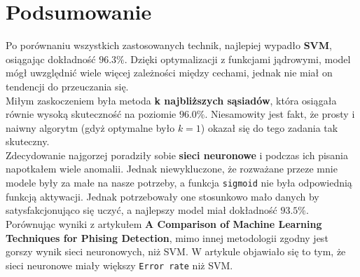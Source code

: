 \documentclass[polish,12pt,a4paper]{extarticle}
\begin{document}
\section*{Podsumowanie}
Po porównaniu wszystkich zastosowanych technik, najlepiej wypadło \textbf{SVM}, osiągając dokładność $96.3 \%$. Dzięki optymalizacji z funkcjami jądrowymi, model mógł uwzględnić wiele więcej zależności między cechami, jednak nie miał on tendencji do przeuczania się. \smallskip \\
Miłym zaskoczeniem była metoda \textbf{k najbliższych sąsiadów}, która osiągała równie wysoką skuteczność na poziomie $96.0\%$. Niesamowity jest fakt, że prosty i naiwny algorytm (gdyż optymalne było $k = 1$) okazał się do tego zadania tak skuteczny. \smallskip \\
Zdecydowanie najgorzej poradziły sobie \textbf{sieci neuronowe} i podczas ich pisania napotkałem wiele anomalii. Jednak niewykluczone, że rozważane przeze mnie modele były za małe na nasze potrzeby, a funkcja \texttt{sigmoid} nie była odpowiednią funkcją aktywacji. Jednak potrzebowały one stosunkowo mało danych by satysfakcjonująco się uczyć, a najlepszy model miał dokładność $93.5 \%$. \smallskip \\
Porównując wyniki z artykułem \textbf{A Comparison of Machine Learning Techniques for Phising Detection}, mimo innej metodologii zgodny jest gorszy wynik sieci neuronowych, niż SVM. W artykule objawiało się to tym, że sieci neuronowe miały większy \texttt{Error rate} niż SVM.
\end{document}
